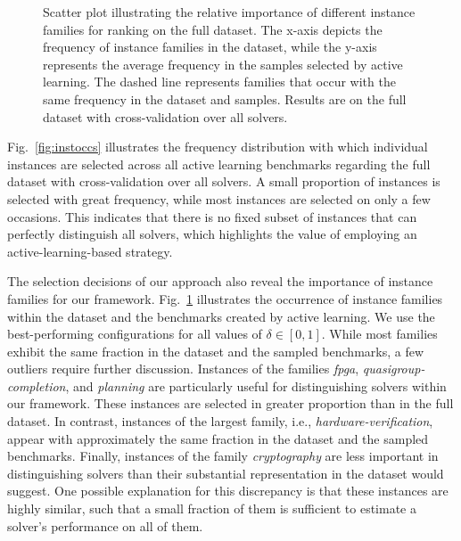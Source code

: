 \documentclass[sn-basic, Numbered]{sn-jnl} %
\begin{document}
\begin{figure}[tb]
  \centering
  \caption{
    Scatter plot illustrating the relative importance of different instance families for ranking on the full dataset. The x-axis depicts the frequency of instance families in the dataset, while the y-axis represents the average frequency in the samples selected by active learning. The dashed line represents families that occur with the same frequency in the dataset and samples. Results are on the full dataset with cross-validation over all solvers.
  }
  \label{fig:annifinalfamilies}
\end{figure}

Fig.~\ref{fig:instoccs} illustrates the frequency distribution with which individual instances are selected across all active learning benchmarks regarding the full dataset with cross-validation over all solvers.
A small proportion of instances is selected with great frequency, while most instances are selected on only a few occasions.
This indicates that there is no fixed subset of instances that can perfectly distinguish all solvers, which highlights the value of employing an active-learning-based strategy.

The selection decisions of our approach also reveal the importance of instance families for our framework.
Fig.~\ref{fig:annifinalfamilies} illustrates the occurrence of instance families within the dataset and the benchmarks created by active learning.
We use the best-performing configurations for all values of $\delta \in \left[0, 1\right]$.
While most families exhibit the same fraction in the dataset and the sampled benchmarks, a few outliers require further discussion.
Instances of the families \emph{fpga}, \emph{quasigroup-completion}, and \emph{planning} are particularly useful for distinguishing solvers within our framework.
These instances are selected in greater proportion than in the full dataset.
In contrast, instances of the largest family, i.e., \emph{hardware-verification}, appear with approximately the same fraction in the dataset and the sampled benchmarks.
Finally, instances of the family \emph{cryptography} are less important in distinguishing solvers than their substantial representation in the dataset would suggest.
One possible explanation for this discrepancy is that these instances are highly similar, such that a small fraction of them is sufficient to estimate a solver's performance on all of them.
\end{document}
